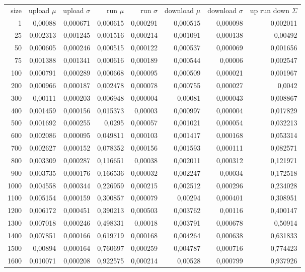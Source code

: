 \begin{tabular}{r r r r r r r r}
size & upload $\mu$  & upload $\sigma$ & run $\mu$ & run $\sigma$ & download $\mu$ & download $\sigma$ & up run down $\Sigma$ \\
1 & 0,00088 & 0,000671 & 0,000615 & 0,000291 & 0,000515 & 0,000098 & 0,002011 \\
25 & 0,002313 & 0,001245 & 0,001516 & 0,000214 & 0,001091 & 0,000138 & 0,00492 \\
50 & 0,000605 & 0,000246 & 0,000515 & 0,000122 & 0,000537 & 0,000069 & 0,001656 \\
75 & 0,001388 & 0,001341 & 0,000616 & 0,000189 & 0,000544 & 0,00006 & 0,002547 \\
100 & 0,000791 & 0,000289 & 0,000668 & 0,000095 & 0,000509 & 0,000021 & 0,001967 \\
200 & 0,000966 & 0,000187 & 0,002478 & 0,000078 & 0,000755 & 0,000027 & 0,0042 \\
300 & 0,00111 & 0,000203 & 0,006948 & 0,000004 & 0,00081 & 0,000043 & 0,008867 \\
400 & 0,001459 & 0,000156 & 0,015373 & 0,00003 & 0,000997 & 0,000004 & 0,017829 \\
500 & 0,001692 & 0,000255 & 0,0295 & 0,000057 & 0,001021 & 0,000054 & 0,032213 \\
600 & 0,002086 & 0,000095 & 0,049811 & 0,000103 & 0,001417 & 0,000168 & 0,053314 \\
700 & 0,002627 & 0,000152 & 0,078352 & 0,000156 & 0,001593 & 0,000111 & 0,082571 \\
800 & 0,003309 & 0,000287 & 0,116651 & 0,00038 & 0,002011 & 0,000312 & 0,121971 \\
900 & 0,003735 & 0,000176 & 0,166536 & 0,000032 & 0,002247 & 0,00034 & 0,172518 \\
1000 & 0,004558 & 0,000344 & 0,226959 & 0,000215 & 0,002512 & 0,000296 & 0,234028 \\
1100 & 0,005154 & 0,000159 & 0,300857 & 0,000079 & 0,00294 & 0,000401 & 0,308951 \\
1200 & 0,006172 & 0,000451 & 0,390213 & 0,000503 & 0,003762 & 0,00116 & 0,400147 \\
1300 & 0,007018 & 0,000246 & 0,498331 & 0,00018 & 0,003791 & 0,000678 & 0,50914 \\
1400 & 0,007851 & 0,000166 & 0,619719 & 0,000168 & 0,004264 & 0,000638 & 0,631833 \\
1500 & 0,00894 & 0,000164 & 0,760697 & 0,000259 & 0,004787 & 0,000716 & 0,774423 \\
1600 & 0,010071 & 0,000208 & 0,922575 & 0,000214 & 0,00528 & 0,000799 & 0,937926 \\

\end{tabular}
